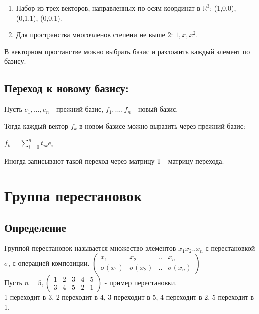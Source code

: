 \documentclass[12pt]{article}
\begin{document}
\begin{enumerate}
    \item Набор из трех векторов, направленных по осям координат в $\mathbb{R}^{3}$:
          (1,0,0), (0,1,1), (0,0,1).

    \item Для пространства многочленов степени не выше $2$: $1, x, x^{2}$.
\end{enumerate}


В векторном простанстве можно выбрать базис и разложить каждый элемент по базису.

\subsection{Переход к новому базису:}

Пусть $e_{1},...,e_{n}$ - прежний базис, $f_{1},...,f_{n}$ - новый базис.

Тогда каждый вектор $f_{k}$ в новом базисе можно выразить через прежний базис:

$f_{k} = \sum\limits_{i=0}^n t_{ik}e_{i}$

Иногда записывают такой переход через матрицу Т - матрицу перехода.

\section{Группа перестановок}
\subsection{Определение}
Группой перестановок называется множество элементов ${x_1 x_2  ..  x_n}$ с перестановкой $\sigma$, с операцией композиции.
$\begin{pmatrix}
        x_1         & x_2         & .. & x_n         \\
        \sigma(x_1) & \sigma(x_2) & .. & \sigma(x_n)
    \end{pmatrix}$\\
Пусть $n=5,
    \begin{pmatrix}
        1 & 2 & 3 & 4 & 5 \\
        3 & 4 & 5 & 2 & 1
    \end{pmatrix}$ - пример перестановки.\\
1 переходит в 3, 2 переходит в 4, 3 переходит в 5, 4 переходит в 2, 5 переходит в 1.\\
\end{document}
